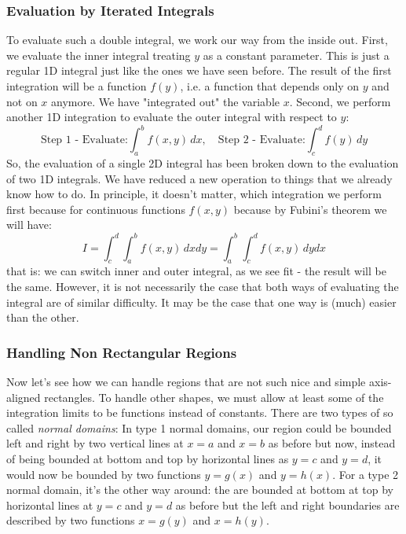 \subsubsection{Evaluation by Iterated Integrals}
To evaluate such a double integral, we work our way from the inside out. First, we evaluate the inner integral treating $y$ as a constant parameter. This is just a regular 1D integral just like the ones we have seen before. The result of the first integration will be a function $f(y)$, i.e. a function that depends only on $y$ and not on $x$ anymore. We have "integrated out" the variable $x$. Second, we perform another 1D integration to evaluate the outer integral with respect to $y$:
\begin{equation}
 \text{Step 1 - Evaluate:}
 \int_a^b f(x,y) \, dx,  \quad
 \text{Step 2 - Evaluate:}
 \int_c^d f(y) \, dy
\end{equation}
So, the evaluation of a single 2D integral has been broken down to the evaluation of two 1D integrals. We have reduced a new operation to things that we already know how to do. In principle, it doesn't matter, which integration we perform first because for continuous functions $f(x,y)$ because by Fubini's theorem we will have:
\begin{equation}
 I = \int_c^d \int_a^b f(x,y) \, dx dy = \int_a^b \int_c^d f(x,y) \, dy dx 
\end{equation}
that is: we can switch inner and outer integral, as we see fit - the result will be the same. However, it is not necessarily the case that both ways of evaluating the integral are of similar difficulty. It may be the case that one way is (much) easier than the other.



\subsubsection{Handling Non Rectangular Regions}
Now let's see how we can handle regions that are not such nice and simple axis-aligned rectangles. To handle other shapes, we must allow at least some of the integration limits to be functions instead of constants. There are two types of so called \emph{normal domains}: In type 1 normal domains, our region could be bounded left and right by two vertical lines at $x = a$ and $x = b$ as before but now, instead of being bounded at bottom and top by horizontal lines as $y = c$ and $y = d$, it would now be bounded by two functions $y = g(x)$ and $y = h(x)$. For a type 2 normal domain, it's the other way around: the are bounded at bottom at top by horizontal lines at $y = c$ and $y = d$  as before but the left and right boundaries are described by two functions $x = g(y)$ and $x = h(y)$.

